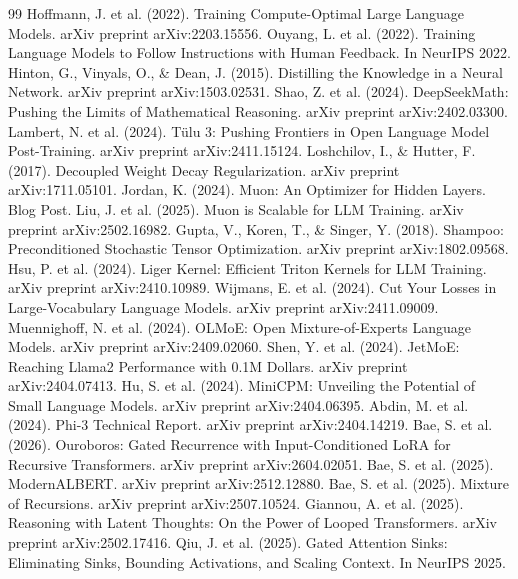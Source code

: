 \documentclass[11pt,twocolumn]{article}
\begin{document}
\begin{thebibliography}{99}
 Hoffmann, J. et al. (2022). Training Compute-Optimal Large Language Models. arXiv preprint arXiv:2203.15556.
 Ouyang, L. et al. (2022). Training Language Models to Follow Instructions with Human Feedback. In NeurIPS 2022.
 Hinton, G., Vinyals, O., \& Dean, J. (2015). Distilling the Knowledge in a Neural Network. arXiv preprint arXiv:1503.02531.
 Shao, Z. et al. (2024). DeepSeekMath: Pushing the Limits of Mathematical Reasoning. arXiv preprint arXiv:2402.03300.
 Lambert, N. et al. (2024). Tülu 3: Pushing Frontiers in Open Language Model Post-Training. arXiv preprint arXiv:2411.15124.
 Loshchilov, I., \& Hutter, F. (2017). Decoupled Weight Decay Regularization. arXiv preprint arXiv:1711.05101.
 Jordan, K. (2024). Muon: An Optimizer for Hidden Layers. Blog Post.
 Liu, J. et al. (2025). Muon is Scalable for LLM Training. arXiv preprint arXiv:2502.16982.
 Gupta, V., Koren, T., \& Singer, Y. (2018). Shampoo: Preconditioned Stochastic Tensor Optimization. arXiv preprint arXiv:1802.09568.
 Hsu, P. et al. (2024). Liger Kernel: Efficient Triton Kernels for LLM Training. arXiv preprint arXiv:2410.10989.
 Wijmans, E. et al. (2024). Cut Your Losses in Large-Vocabulary Language Models. arXiv preprint arXiv:2411.09009.
 Muennighoff, N. et al. (2024). OLMoE: Open Mixture-of-Experts Language Models. arXiv preprint arXiv:2409.02060.
 Shen, Y. et al. (2024). JetMoE: Reaching Llama2 Performance with 0.1M Dollars. arXiv preprint arXiv:2404.07413.
 Hu, S. et al. (2024). MiniCPM: Unveiling the Potential of Small Language Models. arXiv preprint arXiv:2404.06395.
 Abdin, M. et al. (2024). Phi-3 Technical Report. arXiv preprint arXiv:2404.14219.
 Bae, S. et al. (2026). Ouroboros: Gated Recurrence with Input-Conditioned LoRA for Recursive Transformers. arXiv preprint arXiv:2604.02051.
 Bae, S. et al. (2025). ModernALBERT. arXiv preprint arXiv:2512.12880.
 Bae, S. et al. (2025). Mixture of Recursions. arXiv preprint arXiv:2507.10524.
 Giannou, A. et al. (2025). Reasoning with Latent Thoughts: On the Power of Looped Transformers. arXiv preprint arXiv:2502.17416.
 Qiu, J. et al. (2025). Gated Attention Sinks: Eliminating Sinks, Bounding Activations, and Scaling Context. In NeurIPS 2025.

\end{thebibliography}
\end{document}
